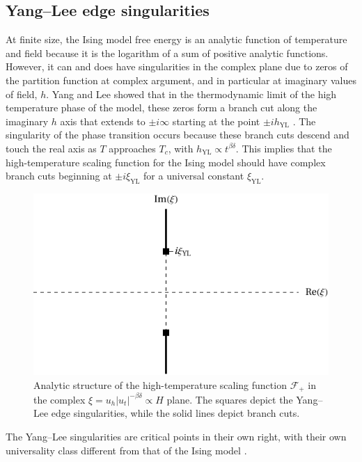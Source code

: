\documentclass[
  aps,
  pre,
  preprint,
  longbibliography,
  floatfix
]{revtex4-2}
\begin{document}
\subsection{Yang--Lee edge singularities}

At finite size, the Ising model free energy is an analytic function of
temperature and field because it is the logarithm of a sum of positive analytic
functions. However, it can and does have singularities in the complex plane due
to zeros of the partition function at complex argument, and in particular at
imaginary values of field, $h$. Yang and Lee showed that in the thermodynamic
limit of the high temperature phase of the model, these zeros form a branch cut
along the imaginary $h$ axis that extends to $\pm i\infty$ starting at the
point $\pm ih_{\mathrm{YL}}$ \cite{Yang_1952_Statistical, Lee_1952_Statistical}.
The singularity of the phase transition occurs because these branch cuts
descend and touch the real axis as $T$ approaches $T_c$, with
$h_{\mathrm{YL}}\propto t^{\beta\delta}$. This implies that the
high-temperature scaling function for the Ising model should have complex
branch cuts beginning at $\pm i\xi_{\mathrm{YL}}$ for a universal constant
$\xi_{\mathrm{YL}}$.

\begin{figure}
  \includegraphics{figs/F_higher_singularities.pdf}
  \caption{
    Analytic structure of the high-temperature scaling function $\mathcal F_+$
    in the complex $\xi=u_h|u_t|^{-\beta\delta}\propto H$ plane. The squares
    depict the Yang--Lee edge singularities, while the solid lines depict
    branch cuts.
  } \label{fig:higher.singularities}
\end{figure}

The Yang--Lee singularities are critical points in their own right, with their own universality class different from that of the Ising model \cite{Fisher_1978_Yang-Lee}.
\end{document}
